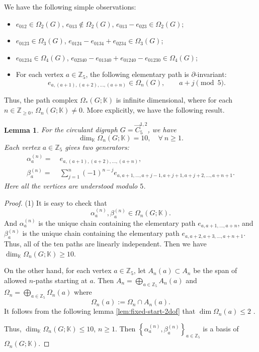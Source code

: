 \documentclass[11pt]{amsart}
\newcommand{\Z}{\mathbb Z}
\theoremstyle{plain}
\newtheorem{lemma}[theorem]{Lemma}
\theoremstyle{definition}
\numberwithin{equation}{section}
\begin{document}
We have the following simple observations:
\begin{itemize}
  \item $e_{012}\in\Omega_2(G)$, $e_{013}\notin\Omega_2(G)$, $e_{013}-e_{023}\in\Omega_2(G)$;
  \item $e_{0123}\in\Omega_3(G)$, $e_{0124}-e_{0134}+e_{0234}\in\Omega_3(G)$;
  \item $e_{01234}\in\Omega_4(G)$, $e_{02340}-e_{01340}+e_{01240}-e_{01230}\in\Omega_4(G)$;
  \item For each vertex $a\in\mathbb{Z}_5$, the following elementary path is $\partial$-invariant:
  $$e_{a,(a+1),(a+2),\ldots,(a+n)}\in\Omega_{n}(G),\qquad a+j\pmod 5.$$
\end{itemize}

Thus, the path complex $\Omega_*(G;\mathbb{K})$ is infinite dimensional, where for each $n\in\Z_{\geq0}$, $\Omega_n(G;\mathbb{K})\neq0$. More explicitly, we have the following result.

\begin{lemma}\label{basis} For the circulant digraph $G=\vec{C}_5^{1,2}$, we have
\[\dim_{\mathbb{K}}\Omega_n(G;\mathbb{K})=10,\quad \forall~n\geq1.\]
Each vertex $a\in\Z_5$ gives two generators:
\begin{align*}
\alpha_a^{(n)}=~&e_{a,(a+1),(a+2),\ldots,(a+n)},\\
\beta_a^{(n)}=~&\sum_{j=1}^n(-1)^{n-j}e_{a,a+1,\ldots,a+j-1,a+j+1,a+j+2,\ldots,a+n+1}.
\end{align*}
Here all the vertices are understood modulo $5$.
\end{lemma}



\begin{proof} (1) It is easy to check that 
\[\alpha_a^{(n)},\beta_a^{(n)}\in\Omega_n(G;\mathbb{K}).\]
And $\alpha_a^{(n)}$ is the unique chain containing the elementary path $e_{a,a+1,\dots,a+n}$, and $\beta_a^{(n)}$ is the unique chain containing the elementary path $e_{a,a+2,a+3,\dots,a+n+1}$. Thus, all of the ten paths are linearly independent. Then we have $\dim_{\mathbb{K}}\Omega_n(G;\mathbb{K})\geq10$. 

On the other hand, for each vertex $a\in\Z_5$, let $A_n(a)\subset A_n$ be the span of allowed $n$-paths starting at $a$.
Then $A_n=\bigoplus_{a\in\Z_5} A_n(a)$ and $\Omega_n=\bigoplus_{a\in\Z_5} \Omega_n(a)$ where
\[\Omega_n(a):=\Omega_n\cap A_n(a).\]
It follows from the following lemma \ref{lem:fixed-start-2dof} that $\dim \Omega_n(a)\le 2$  .

Thus, $\dim_{\mathbb{K}}\Omega_n(G;\mathbb{K})\leq10$, $n\geq1$. Then $\left\{\alpha_a^{(n)},\beta_a^{(n)}\right\}_{a\in\Z_5}$ is a basis of $\Omega_{n}(G;\mathbb{K})$.
\end{proof}
\end{document}
